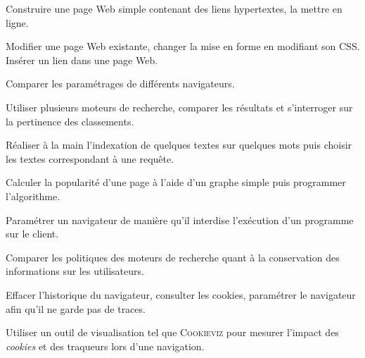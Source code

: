 
\begin{tcolorbox}[title={Ce que propose le programme}, toprule=0pt, leftrule=0pt, rightrule=0pt, arc=0pt,
                  fonttitle=\scshape\boxtitlefont,
                  colbacktitle=white, coltitle=firstcolor, colframe=firstcolor, colback=firstcolor!10,
                  breakable, enhanced jigsaw]
\begin{jazzitemize}
\item Construire une page Web simple contenant des liens hypertextes, la mettre en ligne.   
\item Modifier une page Web existante, changer la mise en forme en modifiant son CSS. Insérer un lien dans une page Web. 
\item Comparer les paramétrages de différents navigateurs.
\item Utiliser plusieurs moteurs de recherche, comparer les résultats et s’interroger sur la pertinence des classements.
\item Réaliser à la main l’indexation de quelques textes sur quelques mots puis choisir les textes correspondant à une requête.
\item Calculer la popularité d’une page à l’aide d’un graphe simple puis programmer l’algorithme.
\item Paramétrer un navigateur de manière qu’il interdise l’exécution d’un programme sur le client.
\item Comparer les politiques des moteurs de recherche quant à la conservation des informations sur les utilisateurs.
\item Effacer l’historique du navigateur, consulter les cookies, paramétrer le navigateur afin qu’il ne garde pas de traces.
\item Utiliser un outil de visualisation tel que \textsc{Cookieviz} pour mesurer l’impact des \textit{cookies} et des traqueurs lors d’une navigation.
\end{jazzitemize}
\end{tcolorbox}

